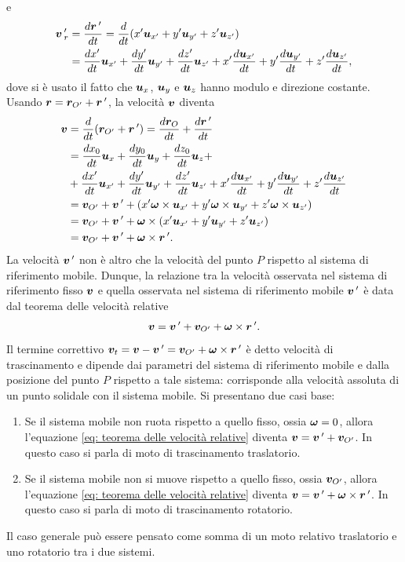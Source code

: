 e
\begin{equation}
    \begin{split}
        \bm{v}\,'_r&=\frac{d\bm{r}\,'}{dt}=\frac{d}{dt}({x'}\bm{u}_{x'}+{y'}\bm{u}_{y'}+{z'}\bm{u}_{z'}) \\
        &=\frac{d{x'}}{dt}\bm{u}_{x'}+\frac{d{y'}}{dt}\bm{u}_{y'}+\frac{d{z'}}{dt}\bm{u}_{z'}+{x'}\frac{d\bm{u}_{x'}}{dt}+{y'}\frac{d\bm{u}_{y'}}{dt}+{z'}\frac{d\bm{u}_{z'}}{dt},
    \end{split}
\end{equation}
dove si è usato il fatto che $\bm{u}_x$, $\bm{u}_y$ e $\bm{u}_z$ hanno modulo e direzione costante. Usando $\bm{r}=\bm{r}_{O'}+\bm{r}\,'$, la velocità $\bm{v}$ diventa
\begin{equation}
    \begin{split}
        \bm{v}&=\frac{d}{dt}(\bm{r}_{O'}+\bm{r}\,')=\frac{d\bm{r}_{O}}{dt}+\frac{d\bm{r}\,'}{dt} \\
        &=\frac{dx_0}{dt}\bm{u}_x+\frac{dy_0}{dt}\bm{u}_y+\frac{dz_0}{dt}\bm{u}_z+ \\
        &+\frac{d{x'}}{dt}\bm{u}_{x'}+\frac{d{y'}}{dt}\bm{u}_{y'}+\frac{d{z'}}{dt}\bm{u}_{z'}+{x'}\frac{d\bm{u}_{x'}}{dt}+{y'}\frac{d\bm{u}_{y'}}{dt}+{z'}\frac{d\bm{u}_{z'}}{dt} \\
        &=\bm{v}_{O'}+\bm{v}\,'+({x'}\bm{\omega}\times\bm{u}_{x'}+{y'}\bm{\omega}\times\bm{u}_{y'}+{z'}\bm{\omega}\times\bm{u}_{z'}) \\
        &=\bm{v}_{O'}+\bm{v}\,'+\bm{\omega}\times({x'}\bm{u}_{x'}+{y'}\bm{u}_{y'}+{z'}\bm{u}_{z'}) \\
        &=\bm{v}_{O'}+\bm{v}\,'+\bm{\omega}\times\bm{r}\,'.
    \end{split}
\end{equation}
La velocità $\bm{v}\,'$ non è altro che la velocità del punto $P$ rispetto al sistema di riferimento mobile. Dunque, la relazione tra la velocità osservata nel sistema di riferimento fisso $\bm{v}$ e quella osservata nel sistema di riferimento mobile $\bm{v}\,'$ è data dal teorema delle velocità relative
\begin{equation}
\label{eq: teorema delle velocità relative}
    \bm{v}=\bm{v}\,'+\bm{v}_{O'}+\bm{\omega}\times\bm{r}\,'.
\end{equation}
Il termine correttivo $\bm{v}_t=\bm{v}-\bm{v}\,'=\bm{v}_{O'}+\bm{\omega}\times\bm{r}\,'$ è detto velocità di trascinamento e dipende dai parametri del sistema di riferimento mobile e dalla posizione del punto $P$ rispetto a tale sistema: corrisponde alla velocità assoluta di un punto solidale con il sistema mobile. Si presentano due casi base:
\begin{enumerate}
    \item Se il sistema mobile non ruota rispetto a quello fisso, ossia $\bm{\omega}=0$, allora l'equazione \eqref{eq: teorema delle velocità relative} diventa $\bm{v}=\bm{v}\,'+\bm{v}_{O'}$. In questo caso si parla di moto di trascinamento traslatorio.
    \item Se il sistema mobile non si muove rispetto a quello fisso, ossia $\bm{v}_{O'}$, allora l'equazione \eqref{eq: teorema delle velocità relative} diventa $\bm{v}=\bm{v}\,'+\bm{\omega}\times\bm{r}\,'$. In questo caso si parla di moto di trascinamento rotatorio.
\end{enumerate}
Il caso generale può essere pensato come somma di un moto relativo traslatorio e uno rotatorio tra i due sistemi. 

